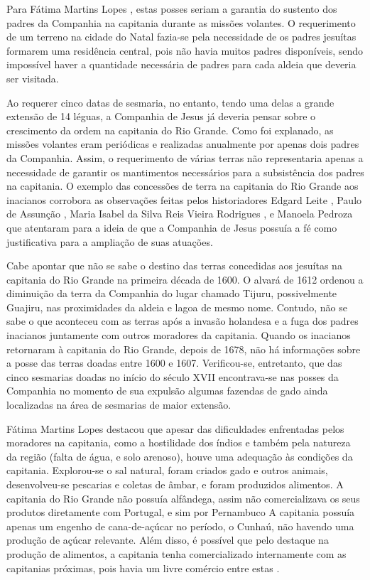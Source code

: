 \begin{refsection}
Para Fátima Martins Lopes \citeyear[p.~107]{Lopes2003}, estas posses seriam a garantia do sustento dos padres da Companhia na capitania durante as missões volantes. O requerimento de um terreno na cidade do Natal fazia-se pela necessidade de os padres jesuítas formarem uma residência central, pois não havia muitos padres disponíveis, sendo impossível haver a quantidade necessária de padres para cada aldeia que deveria ser visitada. 

Ao requerer cinco datas de sesmaria, no entanto, tendo uma delas a grande extensão de 14 léguas, a Companhia de Jesus já deveria pensar sobre o crescimento da ordem na capitania do Rio Grande. Como foi explanado, as missões volantes eram periódicas e realizadas anualmente por apenas dois padres da Companhia. Assim, o requerimento de várias terras não representaria apenas a necessidade de garantir os mantimentos necessários para a subsistência dos padres na capitania. O exemplo das concessões de terra na capitania do Rio Grande aos inacianos corrobora as observações feitas pelos historiadores Edgard Leite \citeyear{Leite2000}, Paulo de Assunção \citeyear{Assuncao2004}, Maria Isabel da Silva Reis Vieira Rodrigues \citeyear{Rodrigues1997}, e Manoela Pedroza \citeyear{Pedroza2020} que atentaram para a ideia de que a Companhia de Jesus possuía a fé como justificativa para a ampliação de suas atuações. 

Cabe apontar que não se sabe o destino das terras concedidas aos jesuítas na capitania do Rio Grande na primeira década de 1600. O alvará de 1612 ordenou a diminuição da terra da Companhia do lugar chamado Tijuru, possivelmente Guajiru, nas proximidades da aldeia e lagoa de mesmo nome. Contudo, não se sabe o que aconteceu com as terras após a invasão holandesa e a fuga dos padres inacianos juntamente com outros moradores da capitania. Quando os inacianos retornaram à capitania do Rio Grande, depois de 1678, não há informações sobre a posse das terras doadas entre 1600 e 1607. Verificou-se, entretanto, que das cinco sesmarias doadas no início do século XVII encontrava-se nas posses da Companhia no momento de sua expulsão algumas fazendas de gado ainda localizadas na área de sesmarias de maior extensão.  

Fátima Martins Lopes \citeyear{Lopes2003} destacou que apesar das dificuldades enfrentadas pelos moradores na capitania, como a hostilidade dos índios e também pela natureza da região (falta de água, e solo arenoso), houve uma adequação às condições da capitania. Explorou-se o sal natural, foram criados gado e outros animais, desenvolveu-se pescarias e coletas de âmbar, e foram produzidos alimentos. A capitania do Rio Grande não possuía alfândega, assim não comercializava os seus produtos diretamente com Portugal, e sim por Pernambuco A capitania possuía apenas um engenho de cana-de-açúcar no período, o Cunhaú, não havendo uma produção de açúcar relevante. Além disso, é possível que pelo destaque na produção de alimentos, a capitania tenha comercializado internamente com as capitanias próximas, pois havia um livre comércio entre estas \cites[p.~191--196]{Dias2011}[p.~203--225]{Dias2018}. 


\end{refsection}
